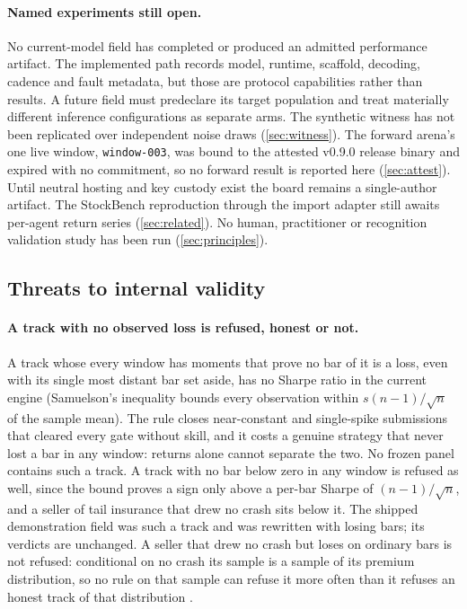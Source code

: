 \paragraph{Named experiments still open.} No current-model field has completed or produced an admitted performance artifact. The implemented path records model, runtime, scaffold, decoding, cadence and fault metadata, but those are protocol capabilities rather than results. A future field must predeclare its target population and treat materially different inference configurations as separate arms. The synthetic witness has not been replicated over independent noise draws (\cref{sec:witness}). The forward arena's one live window, \texttt{window-003}, was bound to the attested v0.9.0 release binary and expired with no commitment, so no forward result is reported here (\cref{sec:attest}). Until neutral hosting and key custody exist the board remains a single-author artifact. The StockBench reproduction through the import adapter still awaits per-agent return series (\cref{sec:related}). No human, practitioner or recognition validation study has been run (\cref{sec:principles}).

\subsection{Threats to internal validity}\label{sec:threats-internal}

\paragraph{A track with no observed loss is refused, honest or not.} A track whose every window has moments that prove no bar of it is a loss, even with its single most distant bar set aside, has no Sharpe ratio in the current engine (Samuelson's inequality bounds every observation within $s(n-1)/\sqrt{n}$ of the sample mean). The rule closes near-constant and single-spike submissions that cleared every gate without skill, and it costs a genuine strategy that never lost a bar in any window: returns alone cannot separate the two. No frozen panel contains such a track. A track with no bar below zero in any window is refused as well, since the bound proves a sign only above a per-bar Sharpe of $(n-1)/\sqrt{n}$, and a seller of tail insurance that drew no crash sits below it. The shipped demonstration field was such a track and was rewritten with losing bars; its verdicts are unchanged. A seller that drew no crash but loses on ordinary bars is not refused: conditional on no crash its sample is a sample of its premium distribution, so no rule on that sample can refuse it more often than it refuses an honest track of that distribution \citep{bahadur1956nonexistence}.

